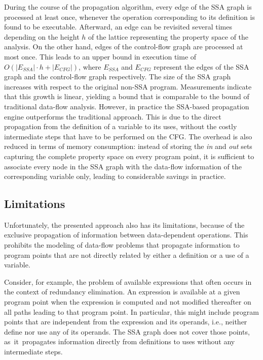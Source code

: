 {
\def\ESSA{E_{\textit{SSA}}}
\def\ECFG{E_{\textit{CFG}}}
During the course of the propagation algorithm, every edge of the SSA graph is
processed at least once, whenever the operation corresponding to its definition
is found to be executable. Afterward, an edge can be revisited several times
depending on the height $h$ of the lattice representing the property
space of the analysis. On the other hand, edges of the control-flow graph are processed at most
once. This leads to an upper bound in execution time of $O(|\ESSA| \cdot h +
|\ECFG|)$, where $\ESSA$ and $\ECFG$ represent the edges of the SSA graph
and the control-flow graph respectively. The size of the
SSA graph increases with respect to the original non-SSA program. Measurements
indicate that this growth is linear, yielding a
bound that is comparable to the bound of traditional data-flow analysis.
However, in practice the SSA-based propagation engine outperforms the
traditional approach. This is  due to the direct propagation from the definition
of a variable to its uses, without the costly intermediate steps that have to be
performed on the CFG. The overhead is also reduced in terms of memory
consumption: instead of storing the \emph{in} and \emph{out} sets capturing the
complete property space on every program point, it is sufficient to
associate every node in the SSA graph with the data-flow information of the
corresponding variable only, leading to considerable savings in practice.
}

\subsection{Limitations}

Unfortunately, the presented approach also has its limitations, because of the 
exclusive propagation of information between data-dependent operations.
%
%
%
This prohibits the
modeling of data-flow problems that propagate information to program points that
are not directly related by either a definition or a use of a variable.

Consider, for example, the problem of available
expressions that often occurs in the context of
redundancy elimination. An expression is available at a given program point when
the expression is computed and not modified thereafter on all paths leading to
that program point. In particular, this might include program points that are
independent from the expression and its operands, i.e., neither define nor use
any of its operands. The SSA graph does not cover those points,
as~it~propagates information directly from definitions to uses without any
intermediate steps.

